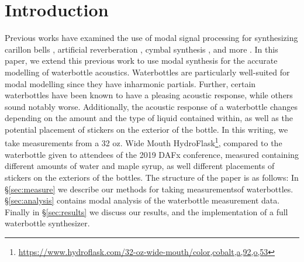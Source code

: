 \documentclass[twoside,a4paper]{article}
\title{\papertitle}
\affiliation{
\paperauthorA \, }
{\href{http://ccrma.stanford.edu}{Center for Computer Research in Music and Acoustics} \\ Stanford University \\ Palo Alto, CA \\ {\tt\{kermit|mrau|jatin\}@ccrma.stanford.edu}}
\newif\ifpdf
\begin{document}
\ifpdf %
  \DeclareGraphicsExtensions{.png,.jpg,.pdf}
\else  %
\fi

\maketitle
%
\begin{abstract}
We present a method for accurately synthesizing the acoustic response
of a waterbottle using modal signal processing. We take extensive
measurements of two waterbottles with considerations for the water
contained within the bottles, and stickers attached to the exterior
of the bottles. We perform modal analysis of these measurements and
implementa a modal waterbottle model as a real-time synthesizer.
\end{abstract}

\section{Introduction} \label{sec:intro}
%
Previous works have examined the use of modal signal processing
for synthesizing carillon bells
\cite{canfielddafilou:werner:bellEffects:2017,rau:das:canfielddafilou:carillon:2019},
artificial reverberation \cite{abel2014a}, cymbal synthesis \cite{travis_cymbals},
and more \cite{abel_kurt_modal}.
In this paper, we extend this previous work to use modal synthesis
for the accurate modelling of waterbottle acoustics. Waterbottles are
particularly well-suited for modal modelling since they have inharmonic
partials. Further, certain waterbottles have been known to have a
pleasing acoustic response, while others sound notably worse.
Additionally, the acoustic response of a waterbottle changes
depending on the amount and the type of liquid contained within, as
well as the potential placement of stickers on the exterior of the bottle.
In this writing, we take measurements from a 32 oz. Wide Mouth
HydroFlask\footnote{\url{https://www.hydroflask.com/32-oz-wide-mouth/color,cobalt,a,92,o,53}},
compared to the waterbottle given to attendees of the 2019 DAFx
conference, measured containing different amounts of water and maple
syrup, as well different placements of stickers on the exteriors of the
bottles.
\newline\newline
The structure of the paper is as follows: In \S\ref{sec:measure} we describe
our methods for taking measurementsof waterbottles. \S\ref{sec:analysis}
contains modal analysis of the waterbottle measurement data.
Finally in \S\ref{sec:results} we discuss our results, and the
implementation of a full waterbottle synthesizer.
\end{document}
